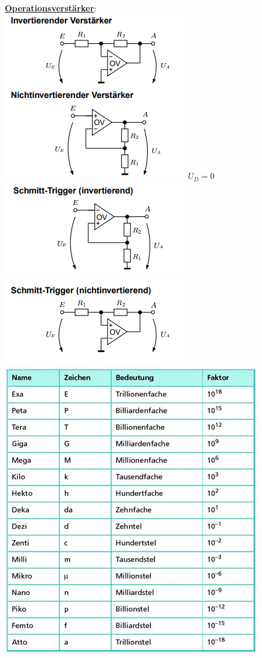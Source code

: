 \documentclass[11pt]{article}
\begin{document}
\begin{minipage}{0.3\textwidth}
\underline{\textbf{Operationsverstärker}}:\\
\includegraphics[scale=0.40]{IOV.png}
\includegraphics[scale=0.40]{NIOV.png}
$U_D = 0$
\includegraphics[scale=0.40]{ISTOV.png}
\includegraphics[scale=0.40]{NISTOV.png}
\includegraphics[scale=0.40]{Zehnerpotenzen.jpg}
\end{minipage}%

\end{document}
